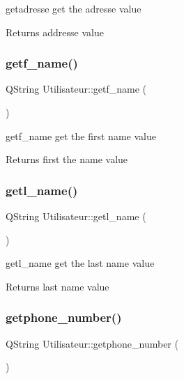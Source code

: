 getadresse get the adresse value 

\begin{DoxyReturn}{Returns}
addresse value 
\end{DoxyReturn}
\mbox{\label{class_utilisateur_ad5f75703c1b9b5e4a66490a4641deb33}} 
\subsubsection{\texorpdfstring{getf\_name()}{getf\_name()}}
{\footnotesize\ttfamily Q\+String Utilisateur\+::getf\+\_\+name (\begin{DoxyParamCaption}{ }\end{DoxyParamCaption})}



getf\+\_\+name get the first name value 

\begin{DoxyReturn}{Returns}
first the name value 
\end{DoxyReturn}
\mbox{\label{class_utilisateur_a8ee5dd09a7d1678a4a98a9c4820ac007}} 
\subsubsection{\texorpdfstring{getl\_name()}{getl\_name()}}
{\footnotesize\ttfamily Q\+String Utilisateur\+::getl\+\_\+name (\begin{DoxyParamCaption}{ }\end{DoxyParamCaption})}



getl\+\_\+name get the last name value 

\begin{DoxyReturn}{Returns}
last name value 
\end{DoxyReturn}
\mbox{\label{class_utilisateur_af2657b63d087c8e8430b8dc00d2117aa}} 
\subsubsection{\texorpdfstring{getphone\_number()}{getphone\_number()}}
{\footnotesize\ttfamily Q\+String Utilisateur\+::getphone\+\_\+number (\begin{DoxyParamCaption}{ }\end{DoxyParamCaption})}



